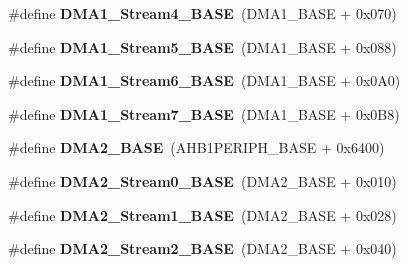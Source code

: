 \begin{DoxyCompactItemize}
\item 
\hypertarget{group___peripheral__memory__map_ga757a3c0d866c0fe68c6176156065a26b}{\#define {\bfseries D\-M\-A1\-\_\-\-Stream4\-\_\-\-B\-A\-S\-E}~(D\-M\-A1\-\_\-\-B\-A\-S\-E + 0x070)}\label{group___peripheral__memory__map_ga757a3c0d866c0fe68c6176156065a26b}

\item 
\hypertarget{group___peripheral__memory__map_ga0ded7bed8969fe2e2d616e7f90eb7654}{\#define {\bfseries D\-M\-A1\-\_\-\-Stream5\-\_\-\-B\-A\-S\-E}~(D\-M\-A1\-\_\-\-B\-A\-S\-E + 0x088)}\label{group___peripheral__memory__map_ga0ded7bed8969fe2e2d616e7f90eb7654}

\item 
\hypertarget{group___peripheral__memory__map_ga58998ddc40adb6361704d6c9dad08125}{\#define {\bfseries D\-M\-A1\-\_\-\-Stream6\-\_\-\-B\-A\-S\-E}~(D\-M\-A1\-\_\-\-B\-A\-S\-E + 0x0\-A0)}\label{group___peripheral__memory__map_ga58998ddc40adb6361704d6c9dad08125}

\item 
\hypertarget{group___peripheral__memory__map_ga82186dd6d3f60995d428b34c041919d7}{\#define {\bfseries D\-M\-A1\-\_\-\-Stream7\-\_\-\-B\-A\-S\-E}~(D\-M\-A1\-\_\-\-B\-A\-S\-E + 0x0\-B8)}\label{group___peripheral__memory__map_ga82186dd6d3f60995d428b34c041919d7}

\item 
\hypertarget{group___peripheral__memory__map_gab72a9ae145053ee13d1d491fb5c1df64}{\#define {\bfseries D\-M\-A2\-\_\-\-B\-A\-S\-E}~(A\-H\-B1\-P\-E\-R\-I\-P\-H\-\_\-\-B\-A\-S\-E + 0x6400)}\label{group___peripheral__memory__map_gab72a9ae145053ee13d1d491fb5c1df64}

\item 
\hypertarget{group___peripheral__memory__map_gac4c67b24726ba6b94d03adb351bcec4d}{\#define {\bfseries D\-M\-A2\-\_\-\-Stream0\-\_\-\-B\-A\-S\-E}~(D\-M\-A2\-\_\-\-B\-A\-S\-E + 0x010)}\label{group___peripheral__memory__map_gac4c67b24726ba6b94d03adb351bcec4d}

\item 
\hypertarget{group___peripheral__memory__map_ga35512bdc3f5e9df4557c2fbe7935d0b1}{\#define {\bfseries D\-M\-A2\-\_\-\-Stream1\-\_\-\-B\-A\-S\-E}~(D\-M\-A2\-\_\-\-B\-A\-S\-E + 0x028)}\label{group___peripheral__memory__map_ga35512bdc3f5e9df4557c2fbe7935d0b1}

\item 
\hypertarget{group___peripheral__memory__map_gaed33a06f08188466f2ede06160984e9a}{\#define {\bfseries D\-M\-A2\-\_\-\-Stream2\-\_\-\-B\-A\-S\-E}~(D\-M\-A2\-\_\-\-B\-A\-S\-E + 0x040)}\label{group___peripheral__memory__map_gaed33a06f08188466f2ede06160984e9a}


\end{DoxyCompactItemize}
